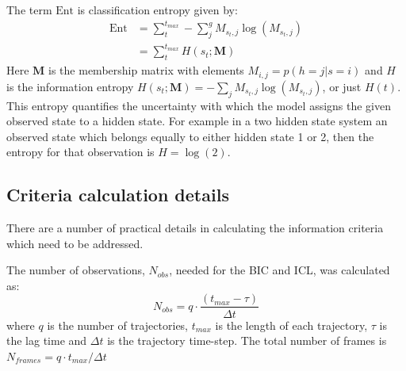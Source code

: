 The term $\mathrm{Ent}$ is classification entropy given by: 
\begin{equation}
\begin{split}
     \mathrm{Ent} & = \sum_{t}^{t_{max}} -\sum_{j}^{g} M_{s_{t}, j}\log{\left(M_{s_{t}, j}\right)}  \\ 
     & =\sum_{t}^{t_{max}} H\left(s_{t}; \mathbf{M}\right)
\end{split}
\end{equation}
Here $\mathbf{M}$ is the membership matrix  with elements $M_{i,j}= p(h=j|s=i)$ and $H$ is the information entropy $H(s_{t};\mathbf{M}) = -\sum_j M_{s_t, j}\log{\left(M_{s_t, j}\right)}$, or just $H(t)$. This entropy quantifies the uncertainty with which the model assigns the given observed state to a hidden state. For example in a two hidden state system an observed state which belongs equally to either hidden state 1 or 2, then the entropy for that observation is $H = \log{(2)}$. 


\subsection{Criteria calculation details}
There are a number of practical details in calculating the information criteria which need to be addressed. 

The number of observations, $N_{obs}$, needed for the BIC and ICL, was calculated as: 
\begin{equation}
    N_{obs} = q\cdot\frac{(t_{max} - \tau)}{\Delta t}
\end{equation}
where $q$ is the number of trajectories, $t_{max}$ is the length of each trajectory, $\tau$ is the lag time and  $\Delta t$ is the trajectory time-step. The total number of frames is $N_{frames} = q\cdot t_{max}/\Delta t$

